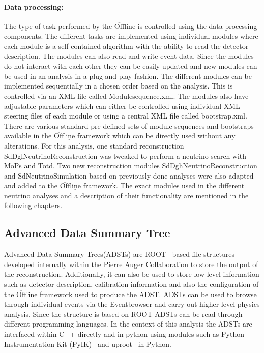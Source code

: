 \paragraph*{Data processing:}
The type of task performed by the $\mathrm{\overline{Off}\underline{line}}$ is controlled using the data processing components. The different tasks are implemented using individual modules where each module is a self-contained algorithm with the ability to read the detector description. The modules can also read and write event data. Since the modules do not interact with each other they can be easily updated and new modules can be used in an analysis in a plug and play fashion. The different modules can be implemented sequentially in a chosen order based on the analysis. This is controlled via an XML file called Modulesequence.xml. The modules also have adjustable parameters which can either be controlled using individual XML steering files of each module or using a central XML file called bootstrap.xml. There are various standard pre-defined sets of module sequences and bootstraps available in the $\mathrm{\overline{Off}\underline{line}}$ framework which can be directly used without any alterations. For this analysis, one standard reconstruction SdDglNeutrinoReconstruction was tweaked to perform a neutrino search with MoPs and Totd. Two new reconstruction modules SdDghNeutrinoReconstruction and SdNeutrinoSimulation based on previously done analyses were also adapted and added to the $\mathrm{\overline{Off}\underline{line}}$ framework. The exact modules used in the different neutrino analyses and a description of their functionality are mentioned in the following chapters.

\subsection{Advanced Data Summary Tree}
\label{sec:ADST}
Advanced Data Summary Trees(ADSTs) are ROOT~\cite{Brun:1997pa} based file structures developed internally within the Pierre Auger Collaboration to store the output of the reconstruction. Additionally, it can also be used to store low level information such as detector description, calibration information and also the configuration of the $\mathrm{\overline{Off}\underline{line}}$ framework used to produce the ADST. ADSTs can be used to browse through individual events via the Eventbrowser and carry out higher level physics analysis. Since the structure is based on ROOT ADSTs can be read through different programming languages. In the context of this analysis the ADSTs are interfaced within C++ directly and in python using modules such as Python Instrumentation Kit (PyIK)~\cite{HDembinski_pyik} and uproot~\cite{Pivarski2024-za} in Python. 

